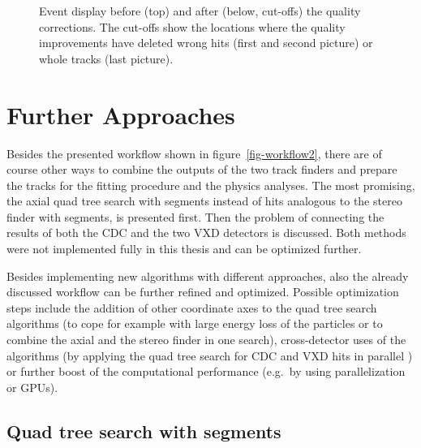 \begin{figure}
\begin{tikzpicture}[>=latex']
    
  \end{tikzpicture}
  \caption{Event display before (top) and after (below, cut-offs) the quality corrections. The cut-offs show the locations where the quality improvements have deleted wrong hits (first and second picture) or whole tracks (last picture).}
  \label{fig-quality}
\end{figure}



\section{Further Approaches} \label{section-outlook}

Besides the presented workflow shown in figure~\ref{fig-workflow2}, there are of course other ways to combine the outputs of the two track finders and prepare the tracks for the fitting procedure and the physics analyses. The most promising, the axial quad tree search with segments instead of hits analogous to the stereo finder with segments, is presented first. Then the problem of connecting the results of both the CDC and the two VXD detectors is discussed. Both methods were not implemented fully in this thesis and can be optimized further.

Besides implementing new algorithms with different approaches, also the already discussed workflow can be further refined and optimized. Possible optimization steps include the addition of other coordinate axes to the quad tree search algorithms (to cope for example with large energy loss of the particles or to combine the axial and the stereo finder in one search), cross-detector uses of the algorithms (by applying the quad tree search for CDC and VXD hits in parallel \cite{markus}) or further boost of the computational performance (e.g.\ by using parallelization or GPUs).

\subsection{Quad tree search with segments}

